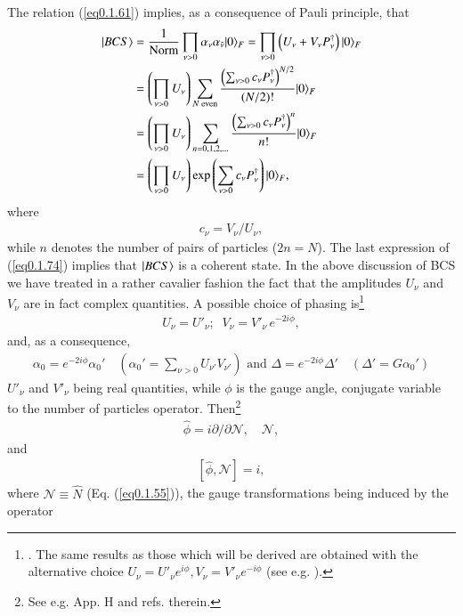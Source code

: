  The relation (\ref{eq0.1.61}) implies, as a consequence of Pauli principle, that 
\begin{align}\label{eq0.1.74}
\nonumber |{BCS} \rangle&=\frac{1}{\text{Norm}}\prod_{\nu>0}\alpha_\nu\alpha_{\tilde\nu}|{0} \rangle_F=\prod_{\nu>0}\left(U_\nu+V_\nu P^\dagger_\nu\right)|{0} \rangle_F\\
\nonumber&=\left(\prod_{\nu>0}U_{\nu}\right)\sum_{N\text{ even}} \frac{\left(\sum_{\nu>0}c_\nu P_\nu^\dagger\right)^{N/2}}{(N/2)!}|{0} \rangle_F\\
\nonumber&=\left(\prod_{\nu>0}U_\nu\right)\sum_{n=0,1,2,\dots}\frac{\left(\sum_{\nu>0}c_\nu P^\dagger_\nu\right)^n}{n!}|{0} \rangle_F\\
&=\left(\prod_{\nu>0}U_\nu\right)\exp\left(\sum_{\nu>0}c_\nu P^\dagger_\nu\right)|{0} \rangle_F,
\end{align}
 where
\begin{align}\label{eq0.1.75}
c_\nu=V_\nu/U_\nu,
\end{align}
while $n$ denotes the number of pairs of particles ($2n=N$). The last expression of (\ref{eq0.1.74}) implies that $|{BCS} \rangle$ is a coherent state.
 In the above discussion of BCS we have treated in a rather cavalier fashion the fact that the amplitudes $U_\nu$ and $V_\nu$ are in fact complex quantities. A possible choice of phasing is\footnote{\cite{Schrieffer:73}. The same results as those which will be derived are obtained with the alternative choice $U_\nu=U'_\nu e^{i\phi},V_\nu=V'_\nu e^{-i\phi}$ (see e.g. \cite{Potel:13b}).} 
\begin{align}\label{eq0.1.76}
U_\nu=U'_\nu;\;\;V_\nu=V'_\nu\, e^{-2i\phi},
\end{align}
and, as a consequence, 
\begin{align}\label{eq0.1.76x}
\alpha_0=e^{-2i\phi}\alpha_0'\quad(\alpha_0'=\sum_{\nu>0}U_{\nu'}V_{\nu'})\text{ and } \Delta=e^{-2i\phi}\Delta'\quad(\Delta'=G\alpha_0')
\end{align}
$U'_\nu$ and $V'_\nu$ being real quantities, while $\phi$ is the gauge angle, conjugate variable to the number of particles operator. Then\footnote{See e.g. \cite{Brink:05} App. H and refs. therein.}
\begin{align}\label{eq0.1.77}
\hat\phi=i\partial/\partial \mathcal N,\quad \mathcal N,
\end{align}
and
\begin{align}\label{eq0.1.78}
\left[\hat \phi,\mathcal N\right]=i,
\end{align}
where $\mathcal N\equiv\hat N$ (Eq. (\ref{eq0.1.55})), the gauge transformations being induced by the operator 
